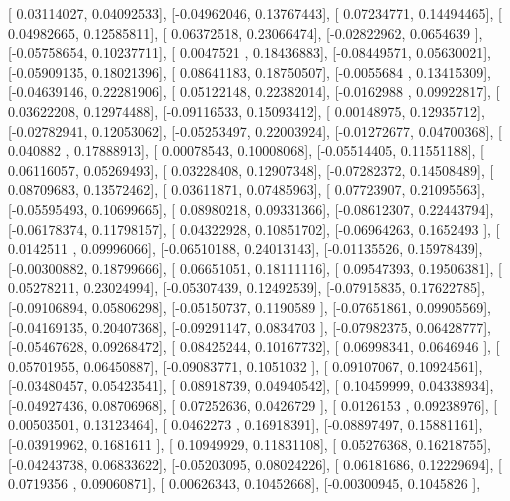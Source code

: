 \documentclass{article}
\begin{document}
       [ 0.03114027,  0.04092533],
       [-0.04962046,  0.13767443],
       [ 0.07234771,  0.14494465],
       [ 0.04982665,  0.12585811],
       [ 0.06372518,  0.23066474],
       [-0.02822962,  0.0654639 ],
       [-0.05758654,  0.10237711],
       [ 0.0047521 ,  0.18436883],
       [-0.08449571,  0.05630021],
       [-0.05909135,  0.18021396],
       [ 0.08641183,  0.18750507],
       [-0.0055684 ,  0.13415309],
       [-0.04639146,  0.22281906],
       [ 0.05122148,  0.22382014],
       [-0.0162988 ,  0.09922817],
       [ 0.03622208,  0.12974488],
       [-0.09116533,  0.15093412],
       [ 0.00148975,  0.12935712],
       [-0.02782941,  0.12053062],
       [-0.05253497,  0.22003924],
       [-0.01272677,  0.04700368],
       [ 0.040882  ,  0.17888913],
       [ 0.00078543,  0.10008068],
       [-0.05514405,  0.11551188],
       [ 0.06116057,  0.05269493],
       [ 0.03228408,  0.12907348],
       [-0.07282372,  0.14508489],
       [ 0.08709683,  0.13572462],
       [ 0.03611871,  0.07485963],
       [ 0.07723907,  0.21095563],
       [-0.05595493,  0.10699665],
       [ 0.08980218,  0.09331366],
       [-0.08612307,  0.22443794],
       [-0.06178374,  0.11798157],
       [ 0.04322928,  0.10851702],
       [-0.06964263,  0.1652493 ],
       [ 0.0142511 ,  0.09996066],
       [-0.06510188,  0.24013143],
       [-0.01135526,  0.15978439],
       [-0.00300882,  0.18799666],
       [ 0.06651051,  0.18111116],
       [ 0.09547393,  0.19506381],
       [ 0.05278211,  0.23024994],
       [-0.05307439,  0.12492539],
       [-0.07915835,  0.17622785],
       [-0.09106894,  0.05806298],
       [-0.05150737,  0.1190589 ],
       [-0.07651861,  0.09905569],
       [-0.04169135,  0.20407368],
       [-0.09291147,  0.0834703 ],
       [-0.07982375,  0.06428777],
       [-0.05467628,  0.09268472],
       [ 0.08425244,  0.10167732],
       [ 0.06998341,  0.0646946 ],
       [ 0.05701955,  0.06450887],
       [-0.09083771,  0.1051032 ],
       [ 0.09107067,  0.10924561],
       [-0.03480457,  0.05423541],
       [ 0.08918739,  0.04940542],
       [ 0.10459999,  0.04338934],
       [-0.04927436,  0.08706968],
       [ 0.07252636,  0.0426729 ],
       [ 0.0126153 ,  0.09238976],
       [ 0.00503501,  0.13123464],
       [ 0.0462273 ,  0.16918391],
       [-0.08897497,  0.15881161],
       [-0.03919962,  0.1681611 ],
       [ 0.10949929,  0.11831108],
       [ 0.05276368,  0.16218755],
       [-0.04243738,  0.06833622],
       [-0.05203095,  0.08024226],
       [ 0.06181686,  0.12229694],
       [ 0.0719356 ,  0.09060871],
       [ 0.00626343,  0.10452668],
       [-0.00300945,  0.1045826 ],
\end{document}

